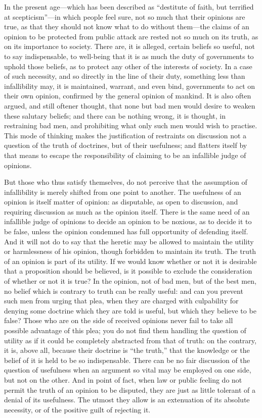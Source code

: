 \documentclass[11pt,openany]{book}
\begin{document}
In the present age---which has been described as ``destitute of faith, but terrified at scepticism''---in which people feel sure, not so much that their opinions are true, as that they should not know what to do without them---the claims of an opinion to be protected from public attack are rested not so much on its truth, as on its importance to society. There are, it is alleged, certain beliefs so useful, not to say indispensable, to well-being that it is as much the duty of governments to uphold those beliefs, as to protect any other of the interests of society. In a case of such necessity, and so directly in the line of their duty, something less than infallibility may, it is maintained, warrant, and even bind, governments to act on their own opinion, confirmed by the general opinion of mankind. It is also often argued, and still oftener thought, that none but bad men would desire to weaken these salutary beliefs; and there can be nothing wrong, it is thought, in restraining bad men, and prohibiting what only such men would wish to practise. This mode of thinking makes the justification of restraints on discussion not a question of the truth of doctrines, but of their usefulness; and flatters itself by that means to escape the responsibility of claiming to be an infallible judge of opinions.

But those who thus satisfy themselves, do not perceive that the assumption of infallibility is merely shifted from one point to another. The usefulness of an opinion is itself matter of opinion: as disputable, as open to discussion, and requiring discussion as much as the opinion itself. There is the same need of an infallible judge of opinions to decide an opinion to be noxious, as to decide it to be false, unless the opinion condemned has full opportunity of defending itself. And it will not do to say that the heretic may be allowed to maintain the utility or harmlessness of his opinion, though forbidden to maintain its truth. The truth of an opinion is part of its utility. If we would know whether or not it is desirable that a proposition should be believed, is it possible to exclude the consideration of whether or not it is true? In the opinion, not of bad men, but of the best men, no belief which is contrary to truth can be really useful: and can you prevent such men from urging that plea, when they are charged with culpability for denying some doctrine which they are told is useful, but which they believe to be false? Those who are on the side of received opinions never fail to take all possible advantage of this plea; you do not find them handling the question of utility as if it could be completely abstracted from that of truth: on the contrary, it is, above all, because their doctrine is ``the truth,'' that the knowledge or the belief of it is held to be so indispensable. There can be no fair discussion of the question of usefulness when an argument so vital may be employed on one side, but not on the other. And in point of fact, when law or public feeling do not permit the truth of an opinion to be disputed, they are just as little tolerant of a denial of its usefulness. The utmost they allow is an extenuation of its absolute necessity, or of the positive guilt of rejecting it.
\end{document}
